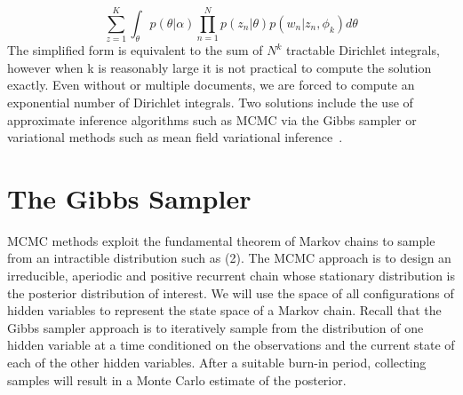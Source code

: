 \documentclass{article}%
\theoremstyle{definition}
\begin{document}
\begin{equation}
\sum\limits_{z=1}^{K}\int_\theta p(\theta|\alpha)\prod\limits_{n=1}^{N}p(z_n|\theta)p(w_n|z_n,\phi_k) d\theta
\end{equation}
The simplified form is equivalent to the sum of $N^k$ tractable Dirichlet integrals, however when k is reasonably large it is not practical to compute the solution exactly. Even without or multiple documents, we are forced to compute an exponential number of Dirichlet integrals. Two solutions include the use of approximate inference algorithms such as MCMC via the Gibbs sampler or variational methods such as mean field variational inference~\cite{NIPS2006_3113}. 

\section{The Gibbs Sampler}
\label{sec:gibbs}
MCMC methods exploit the fundamental theorem of Markov chains to sample from an intractible distribution such as (2). The MCMC approach is to design an irreducible, aperiodic and positive recurrent chain whose stationary distribution is the posterior distribution of interest. We will use the space of all configurations of hidden variables to represent the state space of a Markov chain. Recall that the Gibbs sampler approach is to iteratively sample from the distribution of one hidden variable at a time conditioned on the observations and the current state of each of the other hidden variables. After a suitable burn-in period, collecting samples will result in a Monte Carlo estimate of the posterior. 
\end{document}
